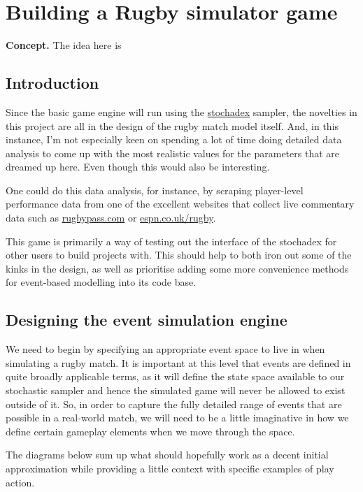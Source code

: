 \documentclass{book}
\begin{document}
\chapter{\sffamily Building a Rugby simulator game}

{\bfseries\sffamily Concept.} The idea here is 

\section{\sffamily Introduction}

Since the basic game engine will run using the \href{https://github.com/umbralcalc/stochadex}{stochadex} sampler, the novelties in this project are all in the design of the rugby match model itself. And, in this instance, I'm not especially keen on spending a lot of time doing detailed data analysis to come up with the most realistic values for the parameters that are dreamed up here. Even though this would also be interesting.

One could do this data analysis, for instance, by scraping player-level performance data from one of the excellent websites that collect live commentary data such as \href{https://www.rugbypass.com/}{rugbypass.com} or \href{https://www.espn.co.uk/rugby/}{espn.co.uk/rugby}.

This game is primarily a way of testing out the interface of the stochadex for other users to build projects with. This should help to both iron out some of the kinks in the design, as well as prioritise adding some more convenience methods for event-based modelling into its code base.

\section{\sffamily Designing the event simulation engine}

We need to begin by specifying an appropriate event space to live in when simulating a rugby match. It is important at this level that events are defined in quite broadly applicable terms, as it will define the state space available to our stochastic sampler and hence the simulated game will never be allowed to exist outside of it. So, in order to capture the fully detailed range of events that are possible in a real-world match, we will need to be a little imaginative in how we define certain gameplay elements when we move through the space.

The diagrams below sum up what should hopefully work as a decent initial approximation while providing a little context with specific examples of play action.
\end{document}
